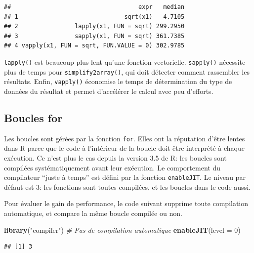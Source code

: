 \documentclass[
  12pt,
  french,
  a4paper,
  extrafontsizes,onecolumn,openright
  ]{memoir}
\newenvironment{Shaded}{\begin{snugshade}}{\end{snugshade}}
\newcommand{\CommentTok}[1]{\textcolor[rgb]{0.56,0.35,0.01}{\textit{#1}}}
\newcommand{\DataTypeTok}[1]{\textcolor[rgb]{0.13,0.29,0.53}{#1}}
\newcommand{\DecValTok}[1]{\textcolor[rgb]{0.00,0.00,0.81}{#1}}
\newcommand{\KeywordTok}[1]{\textcolor[rgb]{0.13,0.29,0.53}{\textbf{#1}}}
\newcommand{\NormalTok}[1]{#1}
\newcommand{\StringTok}[1]{\textcolor[rgb]{0.31,0.60,0.02}{#1}}
\newlength{\rf}
\begin{document}
\begin{verbatim}
##                                    expr   median
## 1                              sqrt(x1)   4.7105
## 2                lapply(x1, FUN = sqrt) 299.2950
## 3                sapply(x1, FUN = sqrt) 361.7385
## 4 vapply(x1, FUN = sqrt, FUN.VALUE = 0) 302.9785
\end{verbatim}

\normalsize
\texttt{lapply()} est beaucoup plus lent qu'une fonction vectorielle.
\texttt{sapply()} nécessite plus de temps pour \texttt{simplify2array()}, qui doit détecter comment rassembler les résultats.
Enfin, \texttt{vapply()} économise le temps de détermination du type de données du résultat et permet d'accélérer le calcul avec peu d'efforts.

\hypertarget{boucles-for}{%
\subsection{Boucles for}\label{boucles-for}}

Les boucles sont gérées par la fonction \texttt{for}.
Elles ont la réputation d'être lentes dans R parce que le code à l'intérieur de la boucle doit être interprété à chaque exécution.
Ce n'est plus le cas depuis la version 3.5 de R: les boucles sont compilées systématiquement avant leur exécution.
Le comportement du compilateur \enquote{juste à temps} est défini par la fonction \texttt{enableJIT}.
Le niveau par défaut est 3: les fonctions sont toutes compilées, et les boucles dans le code aussi.

Pour évaluer le gain de performance, le code suivant supprime toute compilation automatique, et compare la même boucle compilée ou non.

\scriptsize

\begin{Shaded}
\begin{Highlighting}[]
\KeywordTok{library}\NormalTok{(}\StringTok{"compiler"}\NormalTok{)}
\CommentTok{# Pas de compilation automatique}
\KeywordTok{enableJIT}\NormalTok{(}\DataTypeTok{level =} \DecValTok{0}\NormalTok{)}
\end{Highlighting}
\end{Shaded}

\begin{verbatim}
## [1] 3
\end{verbatim}
\end{document}

